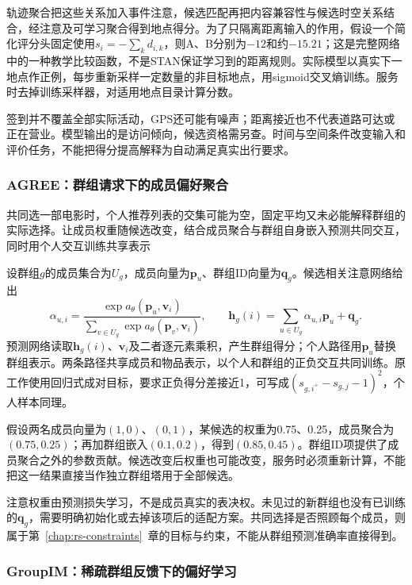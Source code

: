 轨迹聚合把这些关系加入事件注意，候选匹配再把内容兼容性与候选时空关系结合，经注意及可学习聚合得到地点得分。为了只隔离距离输入的作用，假设一个简化评分头固定使用$s_i=-\sum_k d_{i,k}$，则A、B分别为$-12$和约$-15.21$；这是完整网络中的一种教学比较函数，不是STAN保证学习到的距离规则。实际模型以真实下一地点作正例，每步重新采样一定数量的非目标地点，用sigmoid交叉熵训练。服务时去掉训练采样器，对适用地点目录计算分数。

签到并不覆盖全部实际活动，GPS还可能有噪声；距离接近也不代表道路可达或正在营业。模型输出的是访问倾向，候选资格需另查。时间与空间条件改变输入和评价任务，不能把得分提高解释为自动满足真实出行要求。

\subsubsection{AGREE：群组请求下的成员偏好聚合}
\label{sec:rs-agree}

共同选一部电影时，个人推荐列表的交集可能为空，固定平均又未必能解释群组的实际选择。让成员权重随候选改变，结合成员聚合与群组自身嵌入预测共同交互，同时用个人交互训练共享表示

设群组$g$的成员集合为$U_g$，成员向量为$\bm{p}_u$、群组ID向量为$\bm{q}_g$。候选相关注意网络给出
\begin{equation}
  \alpha_{u,i}=
   \frac{\exp a_\theta(\bm{p}_u,\bm{v}_i)}
        {\sum_{v\in U_g}\exp a_\theta(\bm{p}_v,\bm{v}_i)},\qquad
  \bm{h}_g(i)=\sum_{u\in U_g}\alpha_{u,i}\bm{p}_u+\bm{q}_g.
  \label{eq:rs-agree}
\end{equation}
预测网络读取$\bm{h}_g(i)$、$\bm{v}_i$及二者逐元素乘积，产生群组得分；个人路径用$\bm{p}_u$替换群组表示。两条路径共享成员和物品表示，以个人和群组的正负交互共同训练。原工作使用回归式成对目标，要求正负得分差接近1，可写成$(s_{g,i^+}-s_{g,j}-1)^2$，个人样本同理。

假设两名成员向量为$(1,0)$、$(0,1)$，某候选的权重为0.75、0.25，成员聚合为$(0.75,0.25)$；再加群组嵌入$(0.1,0.2)$，得到$(0.85,0.45)$。群组ID项提供了成员聚合之外的参数贡献。候选改变后权重也可能改变，服务时必须重新计算，不能把这一结果直接当作独立群组塔用于全部候选。

注意权重由预测损失学习，不是成员真实的表决权。未见过的新群组也没有已训练的$\bm{q}_g$，需要明确初始化或去掉该项后的适配方案。共同选择是否照顾每个成员，则属于第~\ref{chap:rs-constraints}~章的目标与约束，不能从群组预测准确率直接得到。

\subsubsection{GroupIM：稀疏群组反馈下的偏好学习}
\label{sec:rs-groupim}

